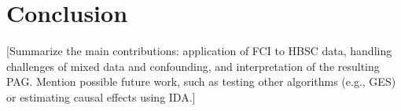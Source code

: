 \section{Conclusion}

[Summarize the main contributions: application of FCI to HBSC data, handling challenges of mixed data and confounding, and interpretation of the resulting PAG. Mention possible future work, such as testing other algorithms (e.g., GES) or estimating causal effects using IDA.]

